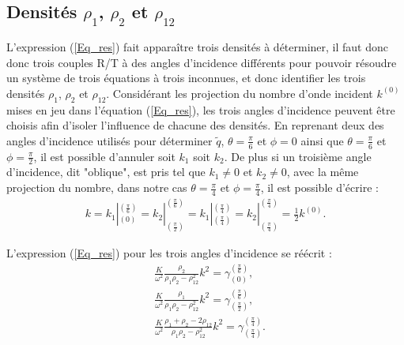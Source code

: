 \documentclass[12pt]{report}
\begin{document}
\subsection{Densités $\rho_1$, $\rho_2$ et $\rho_{12}$}
\label{Ch_Inv_S_rho_SS_rho1/2/12}
    L'expression (\ref{Eq_res}) fait apparaître trois densités à déterminer, il faut donc donc trois couples R/T à des angles d'incidence différents pour pouvoir résoudre un système de trois équations à trois inconnues, et donc identifier les trois densités $\rho_1$, $\rho_2$ et $\rho_{12}$.
    Considérant les projection du nombre d'onde incident $k^{(0)}$ mises en jeu dans l'équation (\ref{Eq_res}), les trois angles d'incidence peuvent être choisis afin d'isoler l'influence de chacune des densités. En reprenant deux des angles d'incidence utilisés pour déterminer $\tilde{q}$, $\theta=\frac{\pi}{6}$ et $\phi=0$ ainsi que $\theta=\frac{\pi}{6}$ et $\phi=\frac{\pi}{2}$, il est possible d'annuler soit $k_1$ soit $k_2$. De plus si un troisième angle d'incidence, dit "oblique", est pris tel que $k_1\ne 0$ et $k_2\ne 0$, avec la même projection du nombre, dans notre cas $\theta=\frac{\pi}{4}$ et $\phi=\frac{\pi}{4}$, il est possible d'écrire :
    \begin{align}
        k=k_1|^{(\frac{\pi}{6})}_{(0)}=k_2|^{(\frac{\pi}{6})}_{(\frac{\pi}{2})}=k_1|^{(\frac{\pi}{4})}_{(\frac{\pi}{4})}=k_2|^{(\frac{\pi}{4})}_{(\frac{\pi}{4})}=\frac{1}{2}k^{(0)}.
    \end{align}
    
    L'expression (\ref{Eq_res}) pour les trois angles d'incidence se réécrit :
        \begin{align}
    &\frac{K}{\omega^2}\frac{\rho_2}{\rho_1\rho_2-\rho_{12}^2}k^2=\gamma^{(\frac{\pi}{6})}_{(0)}\label{Comp_1},\\ &\frac{K}{\omega^2}\frac{\rho_1}{\rho_1\rho_2-\rho_{12}^2}k^2=\gamma^{(\frac{\pi}{6})}_{(\frac{\pi}{2})}\label{Comp_2},\\ &\frac{K}{\omega^2}\frac{\rho_1+\rho_2-2\rho_{12}}{\rho_1\rho_2-\rho_{12}^2}k^2=\gamma^{(\frac{\pi}{4})}_{(\frac{\pi}{4})}\label{Comp_3}.
    \end{align}
\end{document}
